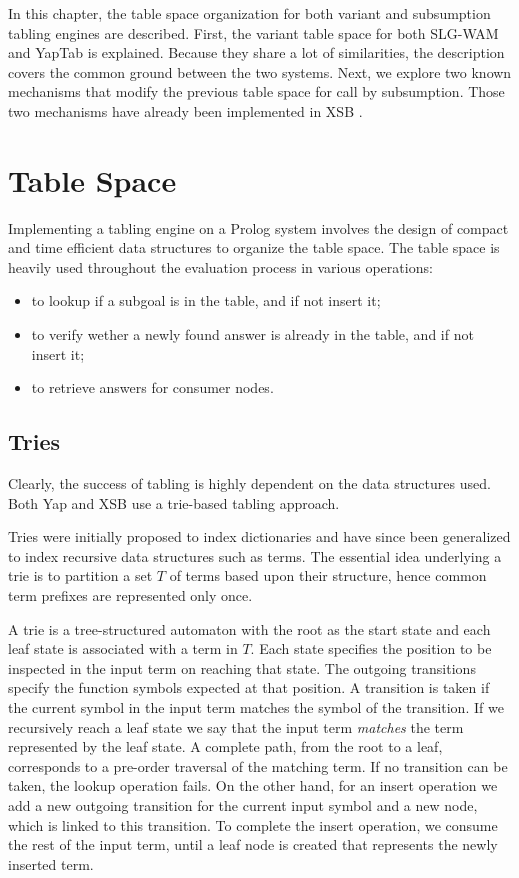 
In this chapter, the table space organization for both variant and subsumption tabling engines are described.
First, the variant table space for both SLG-WAM and YapTab is explained. Because
they share a lot of similarities, the description covers the common ground between the two systems.
Next, we explore two known mechanisms that
modify the previous table space for call by subsumption. Those two mechanisms have already been implemented in XSB
\cite{Rao-96, Johnson-99}.

\section{Table Space} \label{sec:table_space}

Implementing a tabling engine on a Prolog system involves the design of compact and time efficient data structures
to organize the table space. The table space is heavily used throughout the evaluation process in various operations:

\begin{itemize}
  \item to lookup if a subgoal is in the table, and if not insert it;
  \item to verify wether a newly found answer is already in the table, and if not insert it;
  \item to retrieve answers for consumer nodes.
\end{itemize}

\subsection{Tries}

Clearly, the success of tabling is highly dependent on the data structures used.
Both Yap \cite{Rocha-00a} and XSB \cite{RamakrishnanIV-95} use a trie-based tabling approach.

Tries were initially proposed to index dictionaries \cite{Fredkin-62} and have since been generalized to index recursive data structures
such as terms. The essential idea underlying a trie is to partition a set $T$ of terms based upon their structure,
hence common term prefixes are represented only once.

A trie is a tree-structured automaton with the root as the start state and each leaf state is associated with a term in $T$.
Each state specifies the position to be inspected in the input term on reaching that state.
The outgoing transitions specify the function symbols expected at that position.
A transition is taken if the current symbol in the input term matches the symbol of the transition.
If we recursively reach a leaf state we say that the input term \textit{matches} the term represented by the leaf state.
A complete path, from the root to a leaf, corresponds to a pre-order traversal of the matching term.
If no transition can be taken, the lookup operation fails. On the other hand, for an insert operation
we add a new outgoing transition for the current input symbol and a new node, which is linked to this transition.
To complete the insert operation, we consume the rest of the input term, until a leaf node is created that represents
the newly inserted term.

